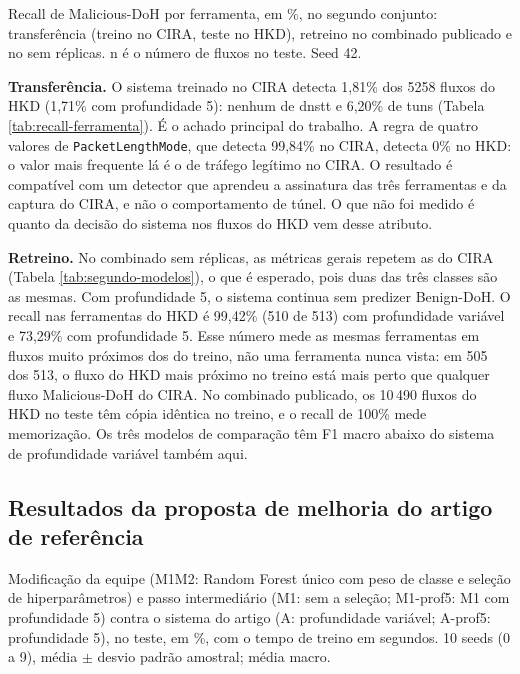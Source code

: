 \documentclass[conference]{IEEEtran}
\newcommand{\tabelacoluna}[1]{{\footnotesize\setlength{\tabcolsep}{3pt}%
  \begin{adjustbox}{max width=\columnwidth}\end{adjustbox}}}
\newcommand{\tabelapagina}[1]{{\footnotesize\setlength{\tabcolsep}{3pt}%
  \begin{adjustbox}{max width=\textwidth}\end{adjustbox}}}
\begin{document}
\begin{table}[!t]
\centering
\caption{Recall de Malicious-DoH por ferramenta, em \%, no segundo conjunto: transferência (treino no CIRA, teste no HKD), retreino no combinado publicado e no sem réplicas. n é o número de fluxos no teste. Seed 42.}
\label{tab:recall-ferramenta}
\tabelacoluna{segundo_recall_ferramenta}
\end{table}

\textbf{Transferência.} O sistema treinado no CIRA detecta 1,81\% dos 5258 fluxos do HKD (1,71\% com profundidade 5): nenhum de dnstt e 6,20\% de tuns (Tabela \ref{tab:recall-ferramenta}). É o achado principal do trabalho. A regra de quatro valores de \texttt{PacketLengthMode}, que detecta 99,84\% no CIRA, detecta 0\% no HKD: o valor mais frequente lá é o de tráfego legítimo no CIRA. O resultado é compatível com um detector que aprendeu a assinatura das três ferramentas e da captura do CIRA, e não o comportamento de túnel. O que não foi medido é quanto da decisão do sistema nos fluxos do HKD vem desse atributo.

\textbf{Retreino.} No combinado sem réplicas, as métricas gerais repetem as do CIRA (Tabela \ref{tab:segundo-modelos}), o que é esperado, pois duas das três classes são as mesmas. Com profundidade 5, o sistema continua sem predizer Benign-DoH. O recall nas ferramentas do HKD é 99,42\% (510 de 513) com profundidade variável e 73,29\% com profundidade 5. Esse número mede as mesmas ferramentas em fluxos muito próximos dos do treino, não uma ferramenta nunca vista: em 505 dos 513, o fluxo do HKD mais próximo no treino está mais perto que qualquer fluxo Malicious-DoH do CIRA. No combinado publicado, os 10\,490 fluxos do HKD no teste têm cópia idêntica no treino, e o recall de 100\% mede memorização. Os três modelos de comparação têm F1 macro abaixo do sistema de profundidade variável também aqui.

\subsection{Resultados da proposta de melhoria do artigo de referência}

\begin{table}[!t]
\centering
\caption{Modificação da equipe (M1M2: Random Forest único com peso de classe e seleção de hiperparâmetros) e passo intermediário (M1: sem a seleção; M1-prof5: M1 com profundidade 5) contra o sistema do artigo (A: profundidade variável; A-prof5: profundidade 5), no teste, em \%, com o tempo de treino em segundos. 10 seeds (0 a 9), média $\pm$ desvio padrão amostral; média macro.}
\label{tab:modificacao}
\tabelapagina{modificacao_metricas_dupla}
\end{table}
\end{document}
